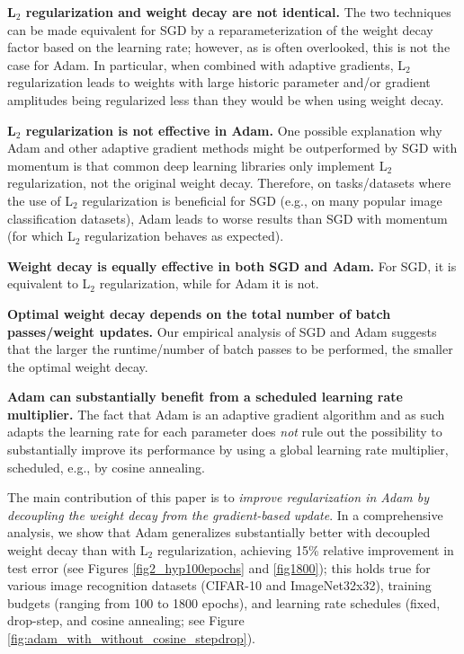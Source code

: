 \begin{description}
	\item \textbf{L$_2$ regularization and weight decay are not identical.} The two techniques can be made equivalent for SGD by a reparameterization of the weight decay factor based on the learning rate; however, as is often overlooked, this is not the case for Adam. In particular, when combined with adaptive gradients, L$_2$ regularization leads to weights with large historic parameter and/or gradient amplitudes being regularized less than they would be when using weight decay.

	\item \textbf{L$_2$ regularization is not effective in Adam.} One possible explanation why Adam and other adaptive gradient methods might be outperformed by SGD with momentum is that common deep learning libraries only implement L$_2$ regularization, not the original weight decay. Therefore, on tasks/datasets where the use of L$_2$ regularization is beneficial for SGD (e.g., on many popular image classification datasets), Adam leads to worse results than SGD with momentum (for which L$_2$ regularization behaves as expected). 

	\item \textbf{Weight decay is equally effective in both SGD and Adam.} For SGD, it is equivalent to L$_2$ regularization, while for Adam it is not.

	\item \textbf{Optimal weight decay depends on the total number of batch passes/weight updates.} Our empirical analysis of SGD and Adam suggests that the larger the runtime/number of batch passes to be performed, the smaller the optimal weight decay. 

	\item \textbf{Adam can substantially benefit from a scheduled learning rate multiplier.} The fact that Adam is an adaptive gradient algorithm and as such adapts the learning rate for each parameter does \emph{not} rule out the possibility to substantially improve its performance by using a global learning rate multiplier, scheduled, e.g., by cosine annealing.
\end{description}

The main contribution of this paper is to \emph{improve regularization in Adam by decoupling the weight decay from the gradient-based update}. In a comprehensive analysis, we show that Adam generalizes substantially better with decoupled weight decay than with L$_2$ regularization, achieving 15\% relative improvement in test error (see Figures \ref{fig2_hyp100epochs} and \ref{fig1800}); this holds true for various image recognition datasets (CIFAR-10 and ImageNet32x32), training budgets (ranging from 100 to 1800 epochs), and learning rate schedules (fixed, drop-step, and cosine annealing; see Figure \ref{fig:adam_with_without_cosine_stepdrop}).

